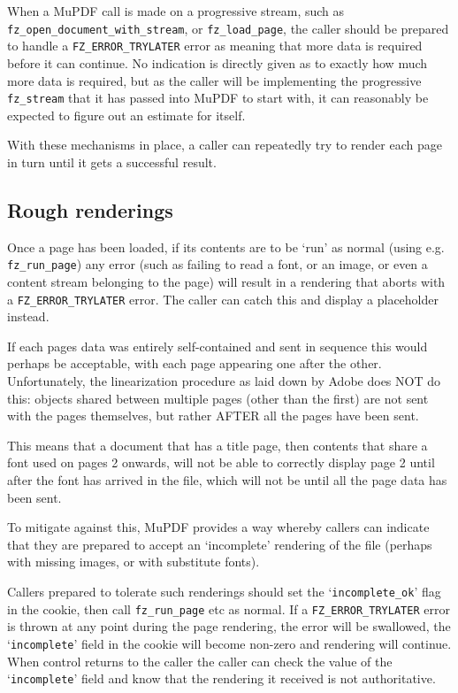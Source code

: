 \documentclass[oneside]{book}
\begin{document}
When a MuPDF call is made on a progressive stream, such as \texttt{fz\_open\_document\_with\_stream}, or \texttt{fz\_load\_page}, the caller should be prepared to handle a \texttt{FZ\_ERROR\_TRYLATER} error as meaning that more data is required before it can continue. No indication is directly given as to exactly how much more data is required, but as the caller will be implementing the progressive \texttt{fz\_stream} that it has passed into MuPDF to start with, it can reasonably be expected to figure out an estimate for itself.

With these mechanisms in place, a caller can repeatedly try to render each page in turn until it gets a successful result.

\subsection{Rough renderings}

Once a page has been loaded, if its contents are to be `run' as normal (using e.g. \texttt{fz\_run\_page}) any error (such as failing to read a font, or an image, or even a content stream belonging to the page) will result in a rendering that aborts with a \texttt{FZ\_ERROR\_TRYLATER} error. The caller can catch this and display a placeholder instead.

If each pages data was entirely self-contained and sent in sequence this would perhaps be acceptable, with each page appearing one after the other. Unfortunately, the linearization procedure as laid down by Adobe does NOT do this: objects shared between multiple pages (other than the first) are not sent with the pages themselves, but rather AFTER all the pages have been sent.

This means that a document that has a title page, then contents that share a font used on pages 2 onwards, will not be able to correctly display page 2 until after the font has arrived in the file, which will not be until all the page data has been sent.

To mitigate against this, MuPDF provides a way whereby callers can indicate that they are prepared to accept an `incomplete' rendering of the file (perhaps with missing images, or with substitute fonts).

Callers prepared to tolerate such renderings should set the `\texttt{incomplete\_ok}' flag in the cookie, then call \texttt{fz\_run\_page} etc as normal. If a \texttt{FZ\_ERROR\_TRYLATER} error is thrown at any point during the page rendering, the error will be swallowed, the `\texttt{incomplete}' field in the cookie will become non-zero and rendering will continue. When control returns to the caller the caller can check the value of the `\texttt{incomplete}' field and know that the rendering it received is not authoritative.
\end{document}
